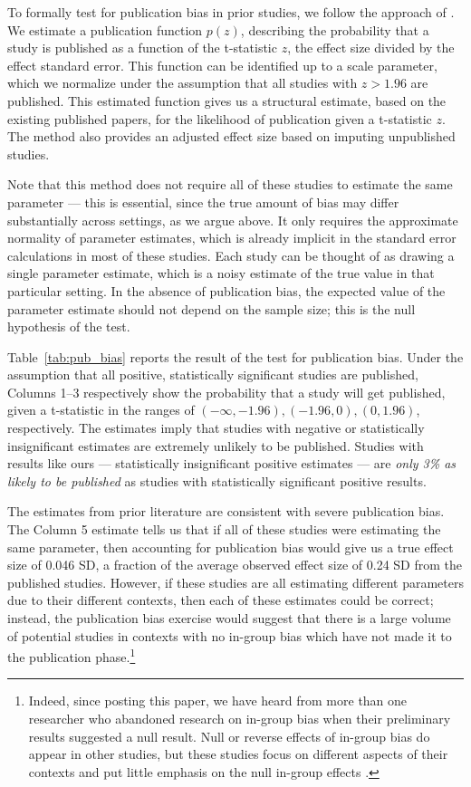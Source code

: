 \documentclass[12pt,english]{article}
\begin{document}
To formally test for publication bias in prior studies, we follow the approach of \citet{andrews2019bias}. We estimate a publication function $p(z)$, describing the probability that a study is published as a function of the t-statistic $z$, the effect size divided by the effect standard error. This function can be identified up to a scale parameter, which we normalize under the assumption that all studies with $z > 1.96$ are published. This estimated function gives us a structural estimate, based on the existing published papers, for the likelihood of publication given a t-statistic $z$. The method also provides an adjusted effect size based on imputing unpublished studies.

Note that this method does not require all of these studies to estimate the same parameter --- this is essential, since the true amount of bias may differ substantially across settings, as we argue above. It only requires the approximate normality of parameter estimates, which is already implicit in the standard error calculations in most of these studies. Each study can be thought of as drawing a single parameter estimate, which is a noisy estimate of the true value in that particular setting. In the absence of publication bias, the expected value of the parameter estimate should not depend on the sample size; this is the null hypothesis of the \citet{andrews2019bias} test.

Table~\ref{tab:pub_bias} reports the result of the test for publication bias. Under the assumption that all positive, statistically significant studies are published, Columns 1--3 respectively show the probability that a study will get published, given a t-statistic in the ranges of $(-\infty, -1.96), (-1.96, 0), (0, 1.96)$, respectively. The estimates imply that studies with negative or statistically insignificant estimates are extremely unlikely to be published. Studies with results like ours --- statistically insignificant positive estimates --- are \textit{only 3\% as likely to be published} as studies with statistically significant positive results.

The estimates from prior literature are consistent with severe publication bias. The Column 5 estimate tells us that if all of these studies were estimating the same parameter, then accounting for publication bias would give us a true effect size of 0.046 SD, a fraction of the average observed effect size of 0.24 SD from the published studies. However, if these studies are all estimating different parameters due to their different contexts, then each of these estimates could be correct; instead, the publication bias exercise would suggest that there is a large volume of potential studies in contexts with no in-group bias which have not made it to the publication phase.\footnote{Indeed, since posting this paper, we have heard from more than one researcher who abandoned research on in-group bias when their preliminary results suggested a null result. Null or reverse effects of in-group bias do appear in other studies, but these studies focus on different aspects of their contexts and put little emphasis on the null in-group effects \citep{arnold2018racial,HannaLinden2012AEJEP}.}
\end{document}
